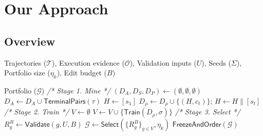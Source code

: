 \documentclass[10pt,conference]{IEEEtran}
\begin{document}
\section{Our Approach}
\label{sec:approach}

\subsection{Overview}

\begin{algorithm}[h]
\caption{\textsc{ZPDPatch}}
\label{alg:construct}
\footnotesize
\begin{algorithmic}[1]
\item[\textbf{Input:}] Trajectories ($\mathcal T$), Execution evidence ($\mathcal O$), Validation inputs ($U$), Seeds ($\Sigma$), Portfolio size ($\eta_k$), Edit budget ($B$)
\item[\textbf{Output:}] Portfolio ($\mathcal G$)
 \Statex\hspace{\algorithmicindent}\textit{/* Stage 1. Mine */}
\State $(D_A,D_S,D_P)\gets(\emptyset,\emptyset,\emptyset)$
 \State $D_A\gets D_A\cup\mathsf{TerminalPairs}(\tau)$ 
  \State $H\gets[s_1]$ 
    \State $D_\rho\gets D_\rho\cup\{(H,c_t)\}$; $H\gets H\mathbin{\|}[s_t]$
   \EndIf
  \EndFor
 \EndFor
\EndFor
 \Statex\hspace{\algorithmicindent}\textit{/* Stage 2. Train */}
\State $V\gets\emptyset$
 \State $V\gets V\cup\{\mathsf{Train}(D_\rho,\sigma)\}$
\EndFor
 \Statex\hspace{\algorithmicindent}\textit{/* Stage 3. Select */}
 \State $R_g^B\gets\mathsf{Validate}(g,U,B)$ 
\EndFor
\State $\mathcal G\gets\mathsf{Select}(\{R_g^B\}_{g\in V},\eta_k)$ 
\State \Return $\mathsf{FreezeAndOrder}(\mathcal G)$
\EndProcedure
\end{algorithmic}
\end{algorithm}
\end{document}
